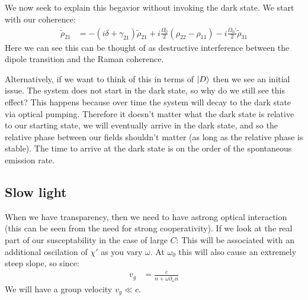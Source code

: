 We now seek to explain this begavior without invoking the dark state.
We start with our coherence:
\begin{align*}
	\dot{\tilde{\rho}}_{21} &= -(i\delta +\gamma_{21})\tilde{\rho}_{21} + i\frac{\Omega_0}{2}(\rho_{22} - \rho_{11}) - i\frac{\Omega_0'}{2}\tilde{\rho}_{31}
\end{align*}
Here we can see this can be thought of as destructive interference between the dipole transition and the Raman coherence.

Alternatively, if we want to think of this in terms of $\ket{D}$ then we see an initial issue. The system does not start in the dark state, so why do we still see this effect? This happens because over time the system will decay to the dark state via optical pumping.
Therefore it doesn't matter what the dark state is relative to our starting state, we will eventually arrive in the dark state, and so the relative phase between our fields shouldn't matter (as long as the relative phase is stable).
The time to arrive at the dark state is on the order of the spontaneous emission rate.

\subsection{Slow light}
When we have transparency, then we need to have  astrong optical interaction (this can be seen from the need for strong cooperativity). If we look at the real part of our susceptability in the case of large $C$:
This will be associated with an additional oscilation of $\chi'$ as you vary $\omega$. At $\omega_0$ this will also cause an extremely steep slope, so since:
\begin{align*}
	v_g &= \frac{c}{n + \omega\partial_\omega n}
\end{align*}
We will have a group velocity $v_g \ll c$.
